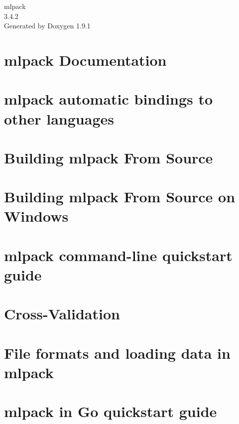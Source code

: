 \let\mypdfximage\pdfximage\def\pdfximage{\immediate\mypdfximage}\documentclass[twoside]{book}
\newcommand{\+}{\discretionary{\mbox{\scriptsize$\hookleftarrow$}}{}{}}
\newcommand{\clearemptydoublepage}{%
  \newpage{\pagestyle{empty}\cleardoublepage}%
}
\begin{document}
\raggedbottom

\begin{titlepage}
\vspace*{7cm}
\begin{center}%
{\Large mlpack \\[1ex]\large 3.\+4.\+2 }\\
\vspace*{1cm}
{\large Generated by Doxygen 1.9.1}\\
\end{center}
\end{titlepage}
\clearemptydoublepage
{}
\tableofcontents
\clearemptydoublepage
{}

\chapter{mlpack Documentation}
\label{index}
\chapter{mlpack automatic bindings to other languages}
\label{bindings}

\chapter{Building mlpack From Source}
\label{build}

\chapter{Building mlpack From Source on Windows}
\label{build_windows}

\chapter{mlpack command-\/line quickstart guide}
\label{cli_quickstart}

\chapter{Cross-\/\+Validation}
\label{cv}

\chapter{File formats and loading data in mlpack}
\label{formatdoc}

\chapter{mlpack in Go quickstart guide}
\label{go_quickstart}

\end{document}
